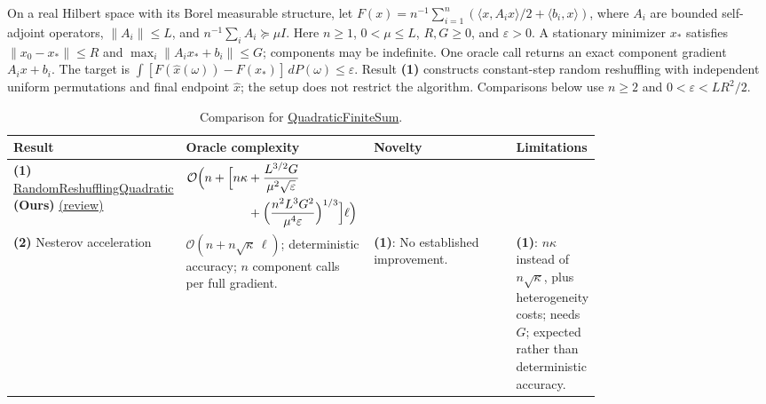 \begin{table}[tp]
\centering
\caption{Comparison for \href{https://github.com/k3nfalt/longtails/blob/main/LongTails/Setups/QuadraticFiniteSum.lean}{QuadraticFiniteSum}.}\label{tab:QuadraticFiniteSum}
\parbox{\linewidth}{\footnotesize
On a real Hilbert space with its Borel measurable structure, let $F(x)=n^{-1}\sum_{i=1}^n(\langle x,A_ix\rangle/2+\langle b_i,x\rangle)$, where $A_i$ are bounded self-adjoint operators, $\|A_i\|\le L$, and $n^{-1}\sum_i A_i\succeq\mu I$. Here $n\ge1$, $0<\mu\le L$, $R,G\ge0$, and $\varepsilon>0$. A stationary minimizer $x_*$ satisfies $\|x_0-x_*\|\le R$ and $\max_i\|A_ix_*+b_i\|\le G$; components may be indefinite. One oracle call returns an exact component gradient $A_ix+b_i$. The target is $\int[F(\widehat x(\omega))-F(x_*)]\,dP(\omega)\le\varepsilon$. Result \textbf{(1)} constructs constant-step random reshuffling with independent uniform permutations and final endpoint $\widehat x$; the setup does not restrict the algorithm. Comparisons below use $n\ge2$ and $0<\varepsilon<LR^2/2$.}\par\smallskip
\begin{threeparttable}
\footnotesize
\setlength{\tabcolsep}{4pt}\renewcommand{\arraystretch}{1.25}
\begin{tabularx}{\linewidth}{@{}>{\raggedright\arraybackslash}p{0.20\linewidth}>{\raggedright\arraybackslash}p{0.32\linewidth}>{\raggedright\arraybackslash}p{0.25\linewidth}>{\raggedright\arraybackslash}X@{}}
\toprule
\textbf{Result} & \textbf{Oracle complexity} & \textbf{Novelty} & \textbf{Limitations} \\
\midrule
\textbf{(1)} \href{https://github.com/k3nfalt/longtails/blob/main/LongTails/Theorems/RandomReshufflingQuadratic.lean}{Random\allowbreak Reshuffling\allowbreak Quadratic} \textbf{(Ours)} \href{https://github.com/k3nfalt/longtails/blob/main/scripts/reviews/RandomReshufflingQuadratic.md}{(review)}
& $\begin{aligned}[t]\mathcal{O}\Bigl(n+\Bigl[n\kappa&+\frac{L^{3/2}G}{\mu^2\sqrt{\varepsilon}}\\ &+\Bigl(\frac{n^2L^3G^2}{\mu^4\varepsilon}\Bigr)^{1/3}\Bigr]\ell\Bigr)\end{aligned}$ & & \\
\midrule[1.2pt]
\textbf{(2)} Nesterov acceleration \citep[Thm.~3.18]{qfsBubeck2015}
& $\mathcal{O}(n+n\sqrt{\kappa}\,\ell)$; deterministic accuracy; $n$ component calls per full gradient.
& \textbf{(1)}: No established improvement.
& \textbf{(1)}: $n\kappa$ instead of $n\sqrt{\kappa}$, plus heterogeneity costs; needs $G$; expected rather than deterministic accuracy. \\

\end{tabularx}
\end{threeparttable}
\end{table}
